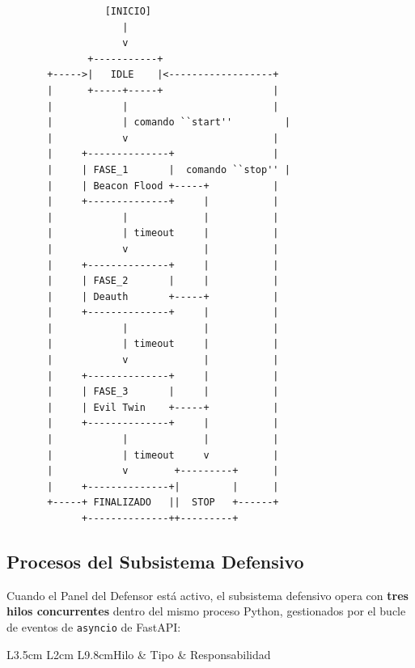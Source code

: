 \documentclass[11pt,a4paper]{article}
\begin{document}
\vspace{0.3cm}
\begin{verbatim}
                 [INICIO]
                    |
                    v
              +-----------+
       +----->|   IDLE    |<------------------+
       |      +-----+-----+                   |
       |            |                         |
       |            | comando ``start''         |
       |            v                         |
       |     +--------------+                 |
       |     | FASE_1       |  comando ``stop'' |
       |     | Beacon Flood +-----+           |
       |     +--------------+     |           |
       |            |             |           |
       |            | timeout     |           |
       |            v             |           |
       |     +--------------+     |           |
       |     | FASE_2       |     |           |
       |     | Deauth       +-----+           |
       |     +--------------+     |           |
       |            |             |           |
       |            | timeout     |           |
       |            v             |           |
       |     +--------------+     |           |
       |     | FASE_3       |     |           |
       |     | Evil Twin    +-----+           |
       |     +--------------+     |           |
       |            |             |           |
       |            | timeout     v           |
       |            v        +---------+      |
       |     +--------------+|         |      |
       +-----+ FINALIZADO   ||  STOP   +------+
             +--------------++---------+
\end{verbatim}

\subsection{Procesos del Subsistema Defensivo}

Cuando el Panel del Defensor está activo, el subsistema defensivo opera
con \textbf{tres hilos concurrentes} dentro del mismo proceso Python,
gestionados por el bucle de eventos de \texttt{asyncio} de FastAPI:

\begin{datatable}{L{3.5cm} L{2cm} L{9.8cm}}{Hilo & Tipo & Responsabilidad}
\end{datatable}
\end{document}
